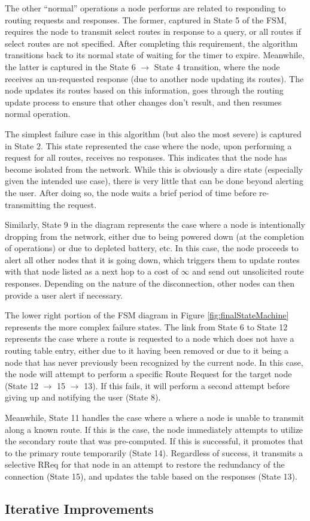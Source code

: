 The other ``normal'' operations a node performs are related to responding to routing requests and responses. The former, captured in State 5 of the FSM, requires the node to transmit select routes in response to a query, or all routes if select routes are not specified.  After completing this requirement, the algorithm transitions back to its normal state of waiting for the timer to expire. Meanwhile, the latter is captured in the State 6 $\rightarrow$ State 4 transition, where the node receives an un-requested response (due to another node updating its routes). The node updates its routes based on this information, goes through the routing update process to ensure that other changes don't result, and then resumes normal operation.

The simplest failure case in this algorithm (but also the most severe) is captured in State 2. This state represented the case where the node, upon performing a request for all routes, receives no responses. This indicates that the node has become isolated from the network. While this is obviously a dire state (especially given the intended use case), there is very little that can be done beyond alerting the user. After doing so, the node waits a brief period of time before re-transmitting the request. 

Similarly, State 9 in the diagram represents the case where a node is intentionally dropping from the network, either due to being powered down (at the completion of operations) or due to depleted battery, etc. In this case, the node proceeds to alert all other nodes that it is going down, which triggers them to update routes with that node listed as a next hop to a cost of $\infty$ and send out unsolicited route responses. Depending on the nature of the disconnection, other nodes can then provide a user alert if necessary. 

The lower right portion of the FSM diagram in Figure \ref{fig:finalStateMachine} represents the more complex failure states. The link from State 6 to State 12 represents the case where a route is requested to a node which does not have a routing table entry, either due to it having been removed or due to it being a node that has never previously been recognized by the current node. In this case, the node will attempt to perform a specific Route Request for the target node (State 12 $\rightarrow$ 15 $\rightarrow$ 13). If this fails, it will perform a second attempt before giving up and notifying the user (State 8).

Meanwhile, State 11 handles the case where a where a node is unable to transmit along a known route. If this is the case, the node immediately attempts to utilize the secondary route that was pre-computed. If this is successful, it promotes that to the primary route temporarily (State 14). Regardless of success, it transmits a selective RReq for that node in an attempt to restore the redundancy of the connection (State 15), and updates the table based on the responses (State 13).

\subsection{Iterative Improvements}\label{subsec:SMiterativeImprovements}